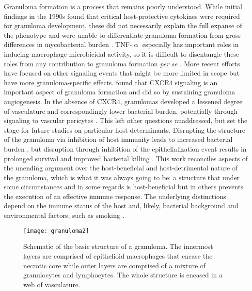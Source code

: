 Granuloma formation is a process that remains poorly understood. While initial findings in the 1990s found that critical host\hyp{}protective cytokines were required for granuloma development, these did not necessarily explain the full expanse of the phenotype and were unable to differentiate granuloma formation from gross differences in mycobacterial burden \cite{Flynn1993, Flynn1995}. TNF\hyp{}$\upalpha$ especially has important roles in inducing macrophage microbicidal activity, so it is difficult to disentangle these roles from any contribution to granuloma formation \textit{per se} \citep{Ramakrishnan2013a}. More recent efforts have focused on other signaling events that might be more limited in scope but have more granuloma\hyp{}specific effects. \citet{Torraca2017} found that CXCR4 signaling is an important aspect of granuloma formation and did so by sustaining granuloma angiogenesis. In the absence of CXCR4, granulomas developed a lessened degree of vasculature and correspondingly lower bacterial burden, potentially through signaling to vascular pericytes \citep{Pollard2009}. This left other questions unaddressed, but set the stage for future studies on particular host determinants. Disrupting the structure of the granuloma via inhibition of host immunity leads to increased bacterial burden \citep{Flynn1993, Flynn1995, Juffermans2000, McElvaniaTekippe2010}, but disruption through inhibition of the epithelialization event results in prolonged survival and improved bacterial killing \citep{Cronan2016}. This work reconciles aspects of the unending argument over the host\hyp{}beneficial and host\hyp{}detrimental nature of the granuloma, which is what it was always going to be: a structure that under some circumstances and in some regards is host\hyp{}beneficial but in others prevents the execution of an effective immune response. The underlying distinctions depend on the immune status of the host and, likely, bacterial background and environmental factors, such as smoking \citep{Glickman2016}. 

\begin{figure}
\begin{center}
\texttt{[image: granuloma2]}
\caption{Schematic of the basic structure of a granuloma. The innermost layers are comprised of epithelioid macrophages that encase the necrotic core while outer layers are comprised of a mixture of granulocytes and lymphocytes. The whole structure is encased in a web of vasculature.}
\label{figure:granny}
\end{center}
\end{figure}

